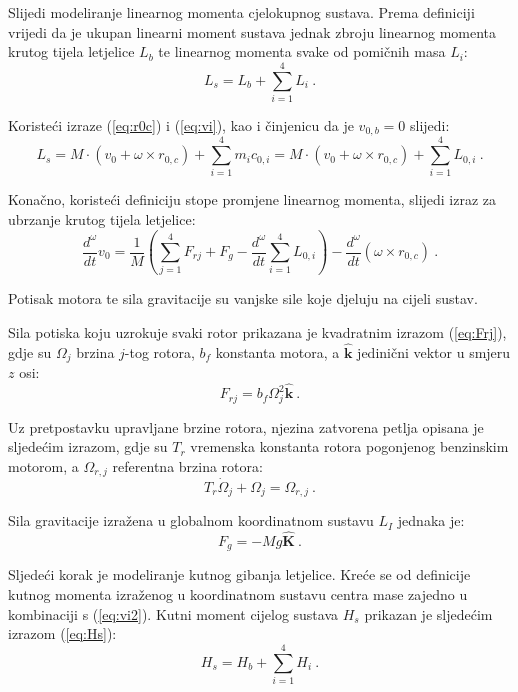 \documentclass[11pt,a4paper]{article}
\begin{document}
Slijedi modeliranje linearnog momenta cjelokupnog sustava. Prema definiciji vrijedi da je ukupan linearni moment sustava jednak zbroju linearnog momenta krutog tijela letjelice $L_{b}$ te linearnog momenta svake od pomičnih masa $L_{i}$:
\begin{equation}
L_{s} = L_{b} + \sum_{i=1}^{4}L_{i} \ .
\label{eq:Ls}
\end{equation}

Koristeći izraze (\ref{eq:r0c}) i (\ref{eq:vi}), kao i činjenicu da je $v_{0,b} = 0$ slijedi:
\begin{equation}
L_{s} = M \cdot (v_{0} + \omega \times r_{0,c}) + \sum_{i=1}^{4}m_{i}c_{0,i} = M \cdot (v_{0} + \omega \times r_{0,c}) + \sum_{i=1}^{4}L_{0,i} \ .
\label{eq:Ls2}
\end{equation}

Konačno, koristeći definiciju stope promjene linearnog momenta, slijedi izraz za ubrzanje krutog tijela letjelice:
\begin{equation}
\frac{d^{\omega}}{dt} v_{0} = \frac{1}{M} \left( \sum_{j=1}^{4} F_{rj} + F_{g} - \frac{d^{\omega}}{dt} \sum_{i=1}^{4}L_{0,i}  \right) - \frac{d^{\omega}}{dt} (\omega \times r_{0,c}) \ .
\label{eq:v0dot}
\end{equation}

Potisak motora te sila gravitacije su vanjske sile koje djeluju na cijeli sustav.

Sila potiska koju uzrokuje svaki rotor prikazana je kvadratnim izrazom (\ref{eq:Frj}), gdje su $\Omega_{j}$ brzina $j$-tog rotora, $b_{f}$ konstanta motora, a  $\bm{\hat{k}}$ jedinični vektor u smjeru $z$ osi:
\begin{equation}
F_{rj} = b_{f}\Omega_{j}^{2} \bm{\hat{k}} \ .
\label{eq:Frj}
\end{equation}


Uz pretpostavku upravljane brzine rotora, njezina zatvorena petlja opisana je sljedećim izrazom, gdje su $T_{r}$ vremenska konstanta rotora pogonjenog benzinskim motorom, a $\Omega_{r,j}$ referentna brzina rotora:
\begin{equation}
T_{r}\dot{\Omega}_{j} + \Omega_{j} = \Omega_{r,j} \ .
\label{eq:omega_rj}
\end{equation}

Sila gravitacije izražena u globalnom koordinatnom sustavu $L_{I}$ jednaka je:
\begin{equation}
F_{g} = -Mg \bm{\hat{K}} \ .
\label{eq:Fg}
\end{equation}


Sljedeći korak je modeliranje kutnog gibanja letjelice. Kreće se od definicije kutnog momenta izraženog u koordinatnom sustavu centra mase zajedno u kombinaciji s (\ref{eq:vi2}). Kutni moment cijelog sustava $H_{s}$ prikazan je sljedećim izrazom (\ref{eq:Hs}):
\begin{equation}
H_{s} = H_{b} + \sum_{i=1}^{4}H_{i} \ .
\label{eq:Hs}
\end{equation}
\end{document}
